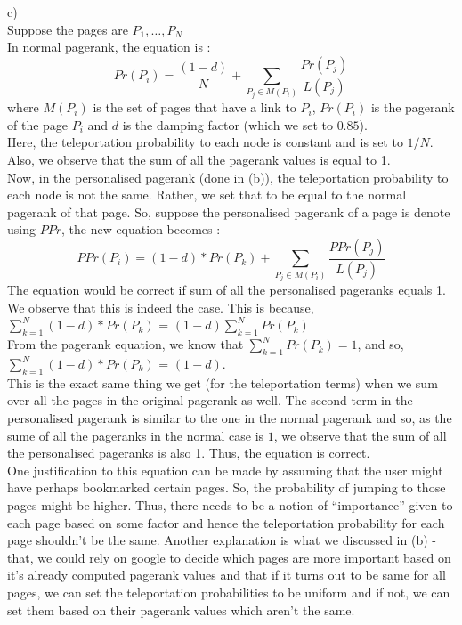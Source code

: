 \documentclass{article}
\begin{document}
c)\\
Suppose the pages are $P_1,\ldots,P_N$\\
In normal pagerank, the equation is :\\
$$Pr(P_i) = \frac{(1-d)}{N} + \sum\limits_{P_j \in M(P_i)} \frac{Pr(P_j)}{L(P_j)} $$
where $M(P_i)$ is the set of pages that have a link to $P_i$, $Pr(P_i)$ is the pagerank of the page $P_i$
and $d$ is the damping factor (which we set to $0.85$).\\
Here, the teleportation probability to each node is constant and is set to $1/N$. Also, we observe that
the sum of all the pagerank values is equal to 1.\\
Now, in the personalised pagerank (done in (b)), the teleportation probability to each node
is not the same. Rather, we set that to be equal to the normal pagerank of that page. So, suppose the 
personalised pagerank of a page is denote using $PPr$, the new equation becomes :\\
$$PPr(P_i) = (1-d)*Pr(P_k) + \sum\limits_{P_j \in M(P_i)} \frac{PPr(P_j)}{L(P_j)} $$
The equation would be correct if sum of all the personalised pageranks equals 1. We observe that this is indeed the case.
This is because,\\
$\sum\limits_{k=1}^{N} (1-d)*Pr(P_k)$ = $(1-d)\sum\limits_{k=1}^{N} Pr(P_k)$\\
From the pagerank equation, we know that $\sum\limits_{k=1}^{N} Pr(P_k) = 1$, and so,\\
$\sum\limits_{k=1}^{N} (1-d)*Pr(P_k)$ = $(1-d)$.\\
This is the exact same thing we get (for the teleportation terms) when we sum over all the pages
in the original pagerank as well. The second term in the personalised pagerank is similar to the one in the normal pagerank
and so, as the sume of all the pageranks in the normal case is $1$, we observe that the sum of all the personalised pageranks is 
also 1. Thus, the equation is correct.\\
One justification to this equation can be made by assuming that the user might have perhaps bookmarked certain pages. So, the probability
of jumping to those pages might be higher. Thus, there needs to be a notion of ``importance'' given to each page based
on some factor and hence the teleportation probability for each page shouldn't be the same. Another explanation is 
what we discussed in (b) - that, we could rely on google to decide which pages are more important based on it's 
already computed pagerank values and that if it turns out to be same for all pages, we can set the teleportation probabilities
to be uniform and if not, we can set them based on their pagerank values which aren't the same.
\end{document}
